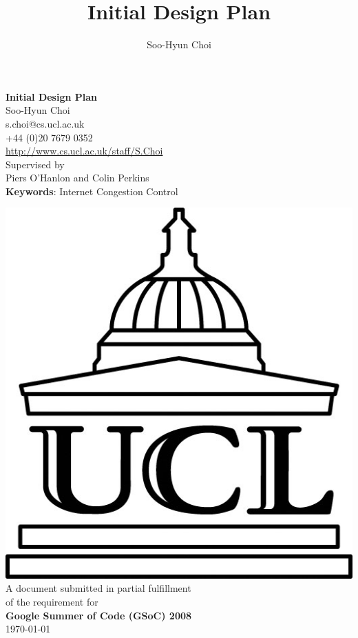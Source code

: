 \documentclass[a4paper,10pt]{article}
\title{Initial Design Plan}
\author{Soo-Hyun Choi}
\begin{document}
\begin{titlepage}
\begin{center}
{\LARGE \textsf{\textbf{Initial Design Plan\\}}}
\vspace{1cm}
{\large \textsf{Soo-Hyun Choi\\}}
{\small \textsf{s.choi@cs.ucl.ac.uk}\\}
{\small \textsf{+44 (0)20 7679 0352}\\}
{\small \url{http://www.cs.ucl.ac.uk/staff/S.Choi}\\}
\vspace{2.5cm}
{\large \textsf{Supervised by \\
Piers O'Hanlon and Colin Perkins \\}}
\vspace{2cm}
{\normalsize \textbf{Keywords}: Internet Congestion Control}
\end{center}

\vspace{2cm}
\begin{small}
\begin{center}
\includegraphics[scale=.15]{./img/ucl_logo} \\
\vspace{1cm}
A document submitted in partial fulfillment \\
of the requirement for \\
\textsf{\textbf{Google Summer of Code (GSoC) 2008}} \\
\vspace{1cm}
\textsf{\today}
\end{center}
\end{small}


\end{titlepage}
\end{document}
